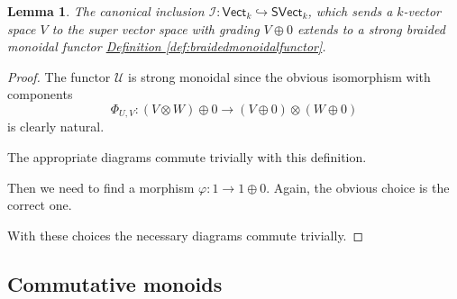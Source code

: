 \documentclass[a4paper,10pt]{scrreprt}
\theoremstyle{definition}
\theoremstyle{plain}
\newtheorem{lemma}{Lemma}[section]
\theoremstyle{remark}
\begin{document}
\begin{lemma}
  \label{lemma:monoidalinclusionofvectorspacesintosupervectorspaces}
  The canonical inclusion $\mathcal{I}\colon \mathsf{Vect}_{k} \hookrightarrow \mathsf{SVect}_{k}$, which sends a $k$-vector space $V$ to the super vector space with grading $V \oplus 0$ extends to a strong braided monoidal functor \hyperref[def:braidedmonoidalfunctor]{Definition \ref*{def:braidedmonoidalfunctor}}.
\end{lemma}
\begin{proof}
  The functor $\mathcal{U}$ is strong monoidal since the obvious isomorphism with components
  \begin{equation*}
    \Phi_{U,V}\colon (V \otimes W) \oplus 0 \to (V \oplus 0) \otimes (W \oplus 0)
  \end{equation*}
  is clearly natural.

  The appropriate diagrams commute trivially with this definition.

  Then we need to find a morphism $\varphi\colon 1 \to 1 \oplus 0$. Again, the obvious choice is the correct one.

  With these choices the necessary diagrams commute trivially.
\end{proof}

\subsection{Commutative monoids}
\end{document}
